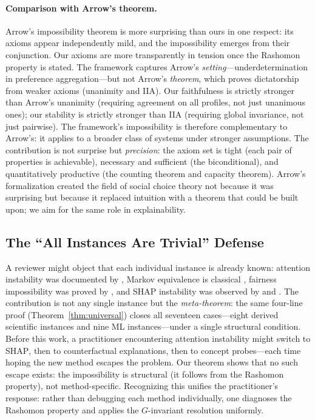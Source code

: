 \documentclass[11pt,a4paper]{article}
\newcommand{\SHAP}{\textsc{SHAP}}
\begin{document}
\paragraph{Comparison with Arrow's theorem.}
Arrow's impossibility theorem \citep{arrow1951social} is more surprising than
ours in one respect: its axioms appear independently mild, and the impossibility
emerges from their conjunction.  Our axioms are more transparently in tension
once the Rashomon property is stated.  The framework captures Arrow's \emph{setting}---underdetermination in preference aggregation---but not Arrow's \emph{theorem}, which proves dictatorship from weaker axioms (unanimity and IIA).  Our faithfulness is strictly stronger than Arrow's unanimity (requiring agreement on all profiles, not just unanimous ones); our stability is strictly stronger than IIA (requiring global invariance, not just pairwise).  The framework's impossibility is therefore complementary to Arrow's: it applies to a broader class of systems under stronger assumptions.  The contribution is not surprise but
\emph{precision}: the axiom set is tight (each pair of properties is
achievable), necessary and sufficient (the biconditional), and quantitatively
productive (the counting theorem and capacity theorem).  Arrow's formalization
created the field of social choice theory not because it was surprising but
because it replaced intuition with a theorem that could be built upon; we aim
for the same role in explainability.

\subsection[The All Instances Are Trivial Defense]{The ``All Instances Are Trivial'' Defense}
\label{sec:trivial}

A reviewer might object that each individual instance is already known: attention
instability was documented by \citet{jainwallace2019}, Markov equivalence is
classical \citep{verma1991equivalence}, fairness impossibility was proved by
\citet{chouldechova2017fair}, and \SHAP{} instability was observed by
\citet{damour2022underspecification} and \citet{krishna2022disagreement}.  The
contribution is not any single instance but the \emph{meta-theorem}: the same
four-line proof (Theorem~\ref{thm:universal}) closes all seventeen cases---eight
derived scientific instances and nine ML instances---under a
single structural condition.  Before this work, a practitioner encountering
attention instability might switch to \SHAP{}, then to counterfactual
explanations, then to concept probes---each time hoping the new method escapes
the problem.  Our theorem shows that no such escape exists: the impossibility
is structural (it follows from the Rashomon property), not method-specific.
Recognizing this unifies the practitioner's response: rather than debugging each
method individually, one diagnoses the Rashomon property and applies the
$G$-invariant resolution uniformly.
\end{document}
